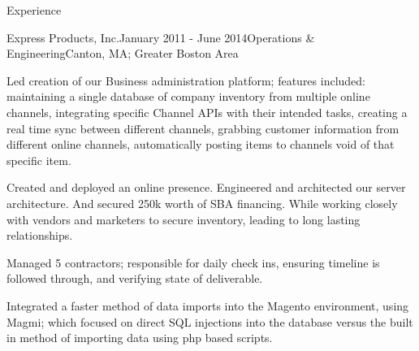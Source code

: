 \documentclass{resume} %
\begin{document}
\begin{rSection}{Experience}
\begin{rSubsection}{Express Products, Inc.}{January 2011 - June 2014}{Operations \& Engineering}{Canton, MA; Greater Boston Area}
\item Led creation of our Business administration platform; features included: maintaining a single database of company inventory from multiple online channels, integrating specific Channel APIs with their intended tasks, creating a real time sync between different channels, grabbing customer information from different online channels, automatically posting items to channels void of that specific item.
 	      \item Created and deployed an online presence. Engineered and architected our server architecture. And secured 250k worth of SBA financing. While working closely with vendors and marketers to secure inventory, leading to long lasting relationships.
 	      \item Managed 5 contractors; responsible for daily check ins, ensuring timeline is followed through, and verifying state of deliverable. 
	      
	      \item Integrated a faster method of data imports into the Magento environment, using Magmi; which 
          focused on direct SQL injections into the database versus the built in method of importing data using
           php based scripts.
\end{rSubsection}



\end{rSection}


\end{document}
